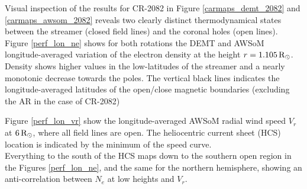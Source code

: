 \documentclass[namedreferences]{solarphysics}
\newcommand{\mrsun}{{\rm R_\odot}}
\begin{document}
\begin{article}

Visual inspection of the results for CR-2082 in Figure \ref{carmaps_demt_2082} and \ref{carmaps_awsom_2082} reveals two clearly distinct thermodynamical states between the streamer (closed field lines) and the coronal holes (open lines). \\

Figure \ref{perf_lon_ne} shows for both rotations the DEMT and AWSoM longitude-averaged variation of the electron density at the height $r=1.105\,\mrsun$. Density shows higher values in the low-latitudes of the streamer and a nearly monotonic decrease towards the poles. The vertical black lines indicates the longitude-averaged latitudes of the open/close magnetic boundaries (excluding the AR in the case of CR-2082)



Figure \ref{perf_lon_vr} show the longitude-averaged AWSoM radial wind speed $V_r$ at $6\,\mrsun$, where all field lines are open. The heliocentric current sheet (HCS) location is indicated by the minimum of the speed curve.\\

Everything to the south of the HCS maps down to the southern open region in the Figures \ref{perf_lon_ne}, and the same for the northern hemisphere, showing an anti-correlation between $N_e$ at low heights and $V_r$.



\end{article}
\end{document}
